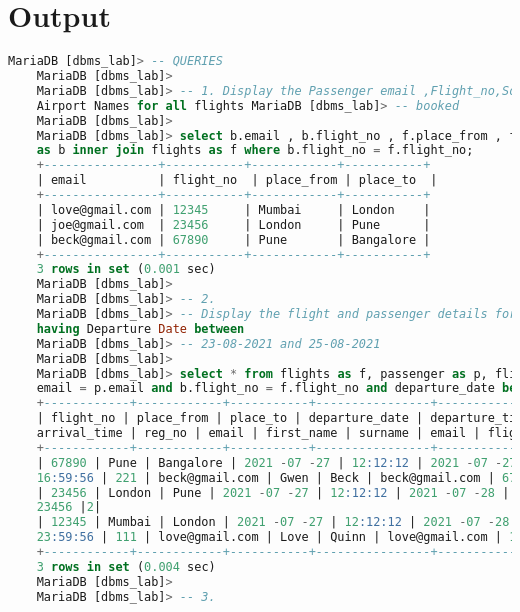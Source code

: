 \documentclass{article}
\begin{document}
\section{\textbf{Output}}
\begin{lstlisting}[language=SQL]
    MariaDB [dbms_lab]> -- QUERIES
    MariaDB [dbms_lab]>
    MariaDB [dbms_lab]> -- 1. Display the Passenger email ,Flight_no,Source and Destination
    Airport Names for all flights MariaDB [dbms_lab]> -- booked
    MariaDB [dbms_lab]>
    MariaDB [dbms_lab]> select b.email , b.flight_no , f.place_from , f.place_to from flight_booking
    as b inner join flights as f where b.flight_no = f.flight_no; 
    +----------------+-----------+------------+-----------+
    | email          | flight_no  | place_from | place_to  | 
    +----------------+-----------+------------+-----------+
    | love@gmail.com | 12345     | Mumbai     | London    | 
    | joe@gmail.com  | 23456     | London     | Pune      |
    | beck@gmail.com | 67890     | Pune       | Bangalore | 
    +----------------+-----------+------------+-----------+
    3 rows in set (0.001 sec)
    MariaDB [dbms_lab]>
    MariaDB [dbms_lab]> -- 2.
    MariaDB [dbms_lab]> -- Display the flight and passenger details for the flights booked
    having Departure Date between
    MariaDB [dbms_lab]> -- 23-08-2021 and 25-08-2021
    MariaDB [dbms_lab]>
    MariaDB [dbms_lab]> select * from flights as f, passenger as p, flight_booking as b where b.
    email = p.email and b.flight_no = f.flight_no and departure_date between "2021-07-27" and " 2021-07-28";
    +------------+------------+-----------+----------------+----------------+--------------+--------
    | flight_no | place_from | place_to | departure_date | departure_time | arrival_date |
    arrival_time | reg_no | email | first_name | surname | email | flight_no | no_seats |
    +------------+------------+-----------+----------------+----------------+--------------+--------
    | 67890 | Pune | Bangalore | 2021 -07 -27 | 12:12:12 | 2021 -07 -27 |
    16:59:56 | 221 | beck@gmail.com | Gwen | Beck | beck@gmail.com | 67890 |6|
    | 23456 | London | Pune | 2021 -07 -27 | 12:12:12 | 2021 -07 -28 | 22:59:56 | 333 | joe@gmail.com | Joe | Goldberg | joe@gmail.com |
    23456 |2|
    | 12345 | Mumbai | London | 2021 -07 -27 | 12:12:12 | 2021 -07 -28 |
    23:59:56 | 111 | love@gmail.com | Love | Quinn | love@gmail.com | 12345 |6|
    +------------+------------+-----------+----------------+----------------+--------------+--------
    3 rows in set (0.004 sec)
    MariaDB [dbms_lab]>
    MariaDB [dbms_lab]> -- 3.

\end{lstlisting}
\end{document}
